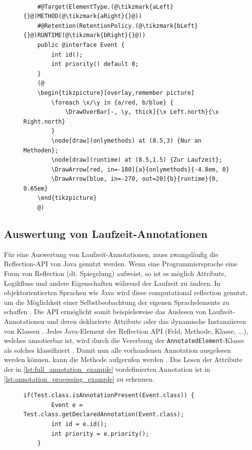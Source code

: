 \begin{figure}[H]
	\centering
	\begin{lstlisting}[caption={Beispiel einer Laufzeit Annotation.}, captionpos=b, label=lst:full_annotation_example]
	
	#@Target(ElementType.(@\tikzmark{aLeft}{}@)METHOD(@\tikzmark{aRight}{}@))
	#@Retention(RetentionPolicy.(@\tikzmark{bLeft}{}@)RUNTIME(@\tikzmark{bRight}{}@))
	public @interface Event {
		int id();
		int priority() default 0;
	}
	(@
	\begin{tikzpicture}[overlay,remember picture]
		\foreach \x/\y in {a/red, b/blue} {
			\DrawOverBar[-, \y, thick]{\x Left.north}{\x Right.north}
		}
		\node[draw](onlymethods) at (8.5,3) {Nur an Methoden};
		\node[draw](runtime) at (8.5,1.5) {Zur Laufzeit};
		\DrawArrow[red, in=-180]{a}{onlymethods}{-4.8em, 0}
		\DrawArrow[blue, in=-270, out=20]{b}{runtime}{0, 0.65em}
	\end{tikzpicture}
	@)
	\end{lstlisting}
\end{figure}

\subsection{Auswertung von Laufzeit-Annotationen}
\label{java_annotation_laufzeitauswertung}
Für eine Auswertung von Laufzeit-Annotationen, muss zwangsläufig die Reflection-API von Java genutzt werden. Wenn eine Programmiersprache eine Form von Reflection (dt. Spiegelung) aufweist, so ist es möglich Attribute, Logikfluss und andere Eigenschaften während der Laufzeit zu ändern. In objektorientierten Sprachen wie Java wird diese \glqq computational reflection\grqq{} genutzt, um die Möglichkeit einer Selbstbeobachtung der eigenen Sprachelemente zu schaffen \cite{Li2017}. Die API ermöglicht somit beispielsweise das Auslesen von Laufzeit-Annotationen und deren deklarierte Attribute oder das dynamische Instanziieren von Klassen \cite{Forman2004}. Jedes Java-Element der Reflection API (Feld, Methode, Klasse, ...), welches annotierbar ist, wird durch die Vererbung der \texttt{AnnotatedElement}-Klasse als solches klassifiziert \cite{Schildt2019}. Damit nun alle vorhandenen Annotation ausgelesen werden können, kann die Methode  aufgerufen werden \cite{Pigula2015}. Das Lesen der Attribute der in \autoref{lst:full_annotation_example} vordefinierten Annotation ist in \autoref{lst:annotation_processing_example} zu erkennen.
\begin{figure}[H]
	\begin{lstlisting}[caption={Auslesen einer Laufzeit-Annotation.}, captionpos=b, label=lst:annotation_processing_example]
    if(Test.class.isAnnotationPresent(Event.class)) {
	    Event e = Test.class.getDeclaredAnnotation(Event.class);
	    int id = e.id();
	    int priority = e.priority();
    }
	\end{lstlisting}
\end{figure}